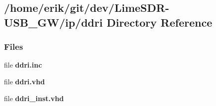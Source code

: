 \subsection{/home/erik/git/dev/\+Lime\+S\+D\+R-\/\+U\+S\+B\+\_\+\+G\+W/ip/ddri Directory Reference}
\label{dir_9cb4c79e3f34c65e053baf8f8014a481}
\subsubsection*{Files}
\begin{DoxyCompactItemize}
\item 
file {\bf ddri.\+inc}
\item 
file {\bf ddri.\+vhd}
\item 
file {\bf ddri\+\_\+inst.\+vhd}
\end{DoxyCompactItemize}
